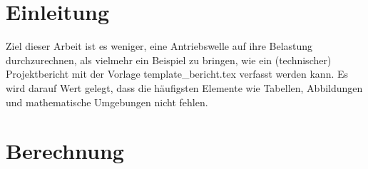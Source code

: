 \documentclass[
a4paper,     %
 headsepline, %
 halfparskip,     %
 fleqn,       %
12pt         %
]{scrartcl}  %
\begin{document}

 \maketitle



 \tableofcontents

 \listoffigures

 \listoftables




\section{Einleitung}
\label{sec:einleitung}

Ziel dieser Arbeit ist es weniger, eine Antriebswelle auf ihre Belastung durchzurechnen, als vielmehr ein Beispiel zu bringen, wie ein (technischer) Projektbericht mit der Vorlage \textsf{template\_bericht.tex} verfasst werden kann. Es wird darauf Wert gelegt, dass die häufigsten Elemente wie Tabellen, Abbildungen und mathematische Umgebungen nicht fehlen.


\section{Berechnung}
\label{sec:berechnung}
\end{document}
